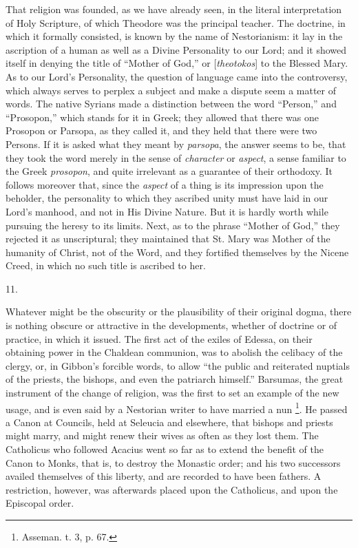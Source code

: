 That religion was founded, as we have already seen, in the literal
interpretation of Holy Scripture, of which Theodore was the principal
teacher. The doctrine, in which it formally consisted, is known by the
name of Nestorianism: it lay in the ascription of a human as well as a
Divine Personality to our Lord; and it showed itself in denying the
title of ``Mother of God,'' or [\emph{theotokos}]
to the Blessed Mary. As to our Lord's Personality, the question of
language came into the controversy, which always serves to perplex a
subject and make a dispute seem a matter of words. The native Syrians
made a distinction between the word ``Person,'' and ``Prosopon,''
which stands for it in Greek; they allowed that there was one Prosopon
or Parsopa, as they called it, and they held that there were two
Persons. If it is asked what they meant by \emph{parsopa}, the answer
seems to be, that they took the word merely in the sense of \emph{character}
or \emph{aspect}, a sense familiar to the Greek \emph{prosopon}, and
quite irrelevant as a guarantee of their orthodoxy. It follows
moreover that, since the \emph{aspect} of a thing is its impression
upon the beholder, the personality to which they ascribed unity must
have laid in our Lord's manhood, and not in His Divine Nature. But it
is hardly worth while pursuing the heresy to its limits. Next, as to
the phrase ``Mother of God,'' they rejected it as
unscriptural; they maintained that St. Mary was Mother of the humanity
of Christ, not of the Word, and they fortified themselves by the
Nicene Creed, in which no such title is ascribed to her.

11.

Whatever might be the obscurity or the plausibility of their
original dogma, there is nothing obscure or attractive in the
developments, whether of doctrine or of practice, in which it issued.
The first act of the exiles of Edessa, on their obtaining power in the
Chaldean communion, was to abolish the celibacy of the clergy, or, in
Gibbon's forcible words, to allow ``the public and reiterated
nuptials of the priests, the bishops, and even the patriarch
himself.'' Barsumas, the great instrument of the change of
religion, was the first to set an example of the new usage, and is
even said by a Nestorian writer to have married a nun \footnote{Asseman. t. 3, p. 67.}. He passed a Canon at Councils, held at Seleucia and
elsewhere, that bishops and priests might marry, and might renew their
wives as often as they lost them. The Catholicus who followed Acacius
went so far as to extend the benefit of the Canon to Monks, that is,
to destroy the Monastic order; and his two successors availed
themselves of this liberty, and are recorded to have been fathers. A
restriction, however, was afterwards placed upon the Catholicus, and
upon the Episcopal order.

